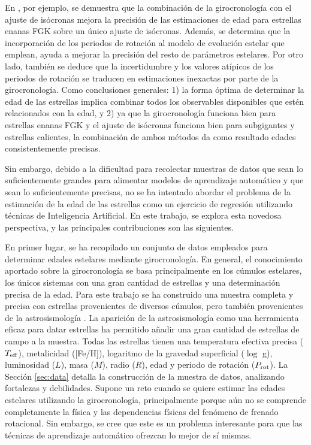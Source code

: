 En \cite{Angus19}, por ejemplo, se demuestra que la combinación de la girocronología con el ajuste de isócronas mejora la precisión de las estimaciones de edad para estrellas enanas FGK sobre un único ajuste de isócronas. Además, se determina que la incorporación de los periodos de rotación al modelo de evolución estelar que emplean, ayuda a mejorar la precisión del resto de parámetros estelares. Por otro lado, también se deduce que la incertidumbre y los valores atípicos de los periodos de rotación se traducen en estimaciones inexactas por parte de la girocronología. Como conclusiones generales: 1) la forma óptima de determinar la edad de las estrellas implica combinar todos los observables disponibles que estén relacionados con la edad, y 2) ya que la girocronología funciona bien para estrellas enanas FGK y el ajuste de isócronas funciona bien para subgigantes y estrellas calientes, la combinación de ambos métodos da como resultado edades consistentemente precisas.



Sin embargo, debido a la dificultad para recolectar muestras de datos que sean lo suficientemente grandes para alimentar modelos de aprendizaje automático y que sean lo suficientemente precisas, no se ha intentado abordar el problema de la estimación de la edad de las estrellas como un ejercicio de regresión utilizando técnicas de Inteligencia Artificial. En este trabajo, se explora esta novedosa perspectiva, y las principales contribuciones son las siguientes.

En primer lugar, se ha recopilado un conjunto de datos empleados para determinar edades estelares mediante girocronología. En general, el conocimiento aportado sobre la girocronología se basa principalmente en los cúmulos estelares, los únicos sistemas con una gran cantidad de estrellas y una determinación precisa de la edad. Para este trabajo se ha construido una muestra completa y precisa con estrellas provenientes de diversos cúmulos, pero también provenientes de la astrosismología \cite{Angus15, Metcalfe19, Saders16}. La aparición de la astrosismología como una herramienta eficaz para datar estrellas ha permitido añadir una gran cantidad de estrellas de campo a la muestra. Todas las estrellas tienen una temperatura efectiva precisa ($T_{\rm eff}$), metalicidad ([Fe/H]), logaritmo de la gravedad superficial ($\log$ g), luminosidad ($L$), masa ($M$), radio ($R$), edad y periodo de rotación ($P_{\rm rot}$). La Sección \ref{sec:data} detalla la construcción de la muestra de datos, analizando fortalezas y debilidades. Supone un reto cuando se quiere estimar las edades estelares utilizando la girocronología, principalmente porque aún no se comprende completamente la física y las dependencias físicas del fenómeno de frenado rotacional. Sin embargo, se cree que este es un problema interesante para que las técnicas de aprendizaje automático ofrezcan lo mejor de sí mismas.


